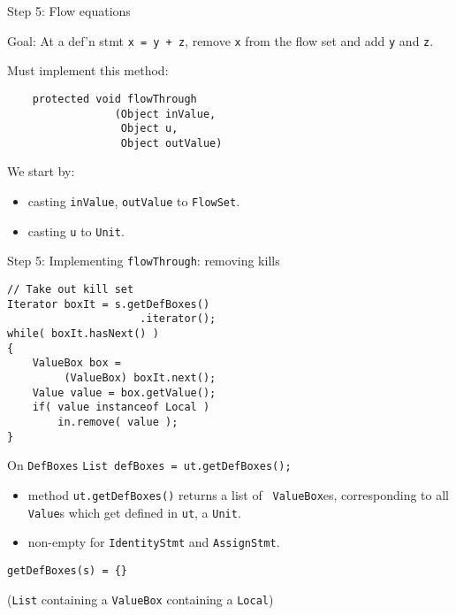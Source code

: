 \begin{slide}{Step 5: Flow equations}
\vspace*{-0.1in}

Goal: At a def'n stmt {\tt x = y + z}, remove {\tt x} from the
flow set and add {\tt y} and {\tt z}.

\vspace*{0.1in}

Must implement this method:
\begin{verbatim}
    protected void flowThrough
                 (Object inValue, 
                  Object u, 
                  Object outValue)
\end{verbatim}

We start by:
\begin{itemize}
\item casting {\tt inValue}, {\tt outValue} to {\tt FlowSet}.

\item casting {\tt u} to {\tt Unit}.
\end{itemize}
\end{slide}

\begin{slide}{Step 5: Implementing {\tt flowThrough}: removing kills}
\begin{verbatim}
// Take out kill set
Iterator boxIt = s.getDefBoxes()
                     .iterator();
while( boxIt.hasNext() ) 
{
    ValueBox box = 
         (ValueBox) boxIt.next();
    Value value = box.getValue();
    if( value instanceof Local )
        in.remove( value );
}
\end{verbatim}
\end{slide}

\begin{slide}{On {\tt DefBoxes}}
\vspace*{-0.1in}
{\tt List defBoxes = ut.getDefBoxes();}

\vspace*{-0.05in}
\begin{itemize}
\item method {\red \tt ut.getDefBoxes()} returns a list of {\tt
ValueBox}es, corresponding to all {\tt Value}s which get defined
in {\tt ut}, a {\tt Unit}. 

\item non-empty for {\tt IdentityStmt} and {\tt AssignStmt}.
\end{itemize}

\vspace*{-0.08in}
\begin{center}
\end{center}

\vspace*{0.05in}
{\tt getDefBoxes(s) = \{\}}\\
\qquad \qquad \begin{minipage}{0.7\textwidth} 
({\tt List} containing a {\tt ValueBox} containing a {\tt Local})
\end{minipage}

\end{slide}

